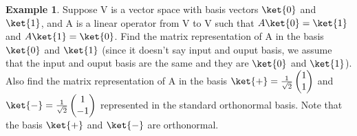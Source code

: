 \documentclass[12pt, oneside]{book}
\theoremstyle{definition}
\theoremstyle{definition}
\newtheorem{example}{Example}[section]
\theoremstyle{remark}
\begin{document}
\begin{example}
    Suppose V is a vector space with basis vectors $\ket{0}$ and $\ket{1}$, and A is a linear operator from
    V to V such that $A\ket{0}=\ket{1}$ and $A\ket{1}=\ket{0}$. Find the matrix representation of A in the basis $\ket{0}$ and $\ket{1}$ 
    (since it doesn't say input and ouput basis, we assume that the input and ouput basis are the same and they are $\ket{0}$ and $\ket{1}$).
    Also find the matrix representation of A in the basis $\ket{+}=\frac{1}{\sqrt{2}}\begin{pmatrix} 1 \\ 1 \end{pmatrix}$ and $\ket{-}=\frac{1}{\sqrt{2}}\begin{pmatrix} 1 \\ -1 \end{pmatrix}$
    represented in the standard orthonormal basis. Note that the basis $\ket{+}$ and $\ket{-}$ are orthonormal.


\end{example}
\end{document}
